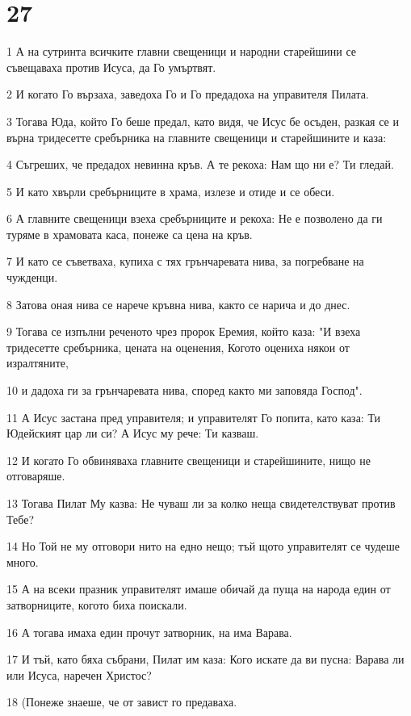 \chapter{27}

\par 1 А на сутринта всичките главни свещеници и народни старейшини се съвещаваха против Исуса, да Го умъртвят.
\par 2 И когато Го вързаха, заведоха Го и Го предадоха на управителя Пилата.
\par 3 Тогава Юда, който Го беше предал, като видя, че Исус бе осъден, разкая се и върна тридесетте сребърника на главните свещеници и старейшините и каза:
\par 4 Съгреших, че предадох невинна кръв. А те рекоха: Нам що ни е? Ти гледай.
\par 5 И като хвърли сребърниците в храма, излезе и отиде и се обеси.
\par 6 А главните свещеници взеха сребърниците и рекоха: Не е позволено да ги туряме в храмовата каса, понеже са цена на кръв.
\par 7 И като се съветваха, купиха с тях грънчаревата нива, за погребване на чужденци.
\par 8 Затова оная нива се нарече кръвна нива, както се нарича и до днес.
\par 9 Тогава се изпълни реченото чрез пророк Еремия, който каза: "И взеха тридесетте сребърника, цената на оценения, Когото оцениха някои от изралтяните,
\par 10 и дадоха ги за грънчаревата нива, според както ми заповяда Господ".
\par 11 А Исус застана пред управителя; и управителят Го попита, като каза: Ти Юдейският цар ли си? А Исус му рече: Ти казваш.
\par 12 И когато Го обвиняваха главните свещеници и старейшините, нищо не отговаряше.
\par 13 Тогава Пилат Му казва: Не чуваш ли за колко неща свидетелствуват против Тебе?
\par 14 Но Той не му отговори нито на едно нещо; тъй щото управителят се чудеше много.
\par 15 А на всеки празник управителят имаше обичай да пуща на народа един от затворниците, когото биха поискали.
\par 16 А тогава имаха един прочут затворник, на има Варава.
\par 17 И тъй, като бяха събрани, Пилат им каза: Кого искате да ви пусна: Варава ли или Исуса, наречен Христос?
\par 18 (Понеже знаеше, че от завист го предаваха.
